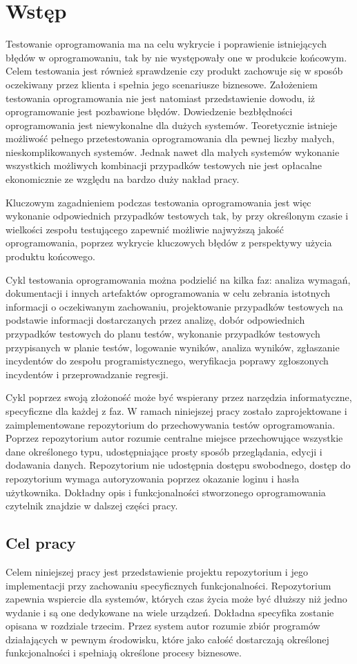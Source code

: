 \chapter{Wstęp}
Testowanie oprogramowania ma na celu wykrycie i poprawienie istniejących błędów w oprogramowaniu, tak by nie występowały one w produkcie końcowym. Celem testowania jest również sprawdzenie czy produkt zachowuje się w sposób oczekiwany przez klienta i spełnia jego scenariusze biznesowe. Założeniem testowania oprogramowania nie jest natomiast przedstawienie dowodu, iż oprogramowanie jest pozbawione błędów. Dowiedzenie bezbłędności oprogramowania jest niewykonalne dla dużych systemów. Teoretycznie istnieje możliwość pełnego przetestowania oprogramowania dla pewnej liczby małych, nieskomplikowanych systemów. Jednak nawet dla małych systemów wykonanie wszystkich możliwych kombinacji przypadków testowych nie jest opłacalne ekonomicznie ze względu na bardzo duży nakład pracy. 

Kluczowym zagadnieniem podczas testowania oprogramowania jest więc wykonanie odpowiednich przypadków testowych tak, by przy określonym czasie i wielkości zespołu testującego zapewnić możliwie najwyższą jakość oprogramowania, poprzez wykrycie kluczowych błędów z perspektywy użycia produktu końcowego.  

Cykl testowania oprogramowania można podzielić na kilka faz: analiza wymagań, dokumentacji i innych artefaktów oprogramowania w celu zebrania istotnych informacji o oczekiwanym zachowaniu, projektowanie przypadków testowych na podstawie informacji dostarczanych przez analizę, dobór odpowiednich przypadków testowych do planu testów, wykonanie przypadków testowych przypisanych w planie testów, logowanie wyników, analiza wyników, zgłaszanie incydentów do zespołu programistycznego, weryfikacja poprawy zgłoszonych incydentów i przeprowadzanie regresji.

Cykl poprzez swoją złożoność może być wspierany przez narzędzia informatyczne, specyficzne dla każdej z faz. W ramach niniejszej pracy zostało zaprojektowane i zaimplementowane repozytorium do przechowywania testów oprogramowania. Poprzez repozytorium autor rozumie centralne miejsce przechowujące wszystkie dane określonego typu, udostępniające prosty sposób przeglądania, edycji i dodawania danych. Repozytorium nie udostępnia dostępu swobodnego, dostęp do repozytorium wymaga autoryzowania poprzez okazanie loginu i hasła użytkownika. Dokładny opis i funkcjonalności stworzonego oprogramowania czytelnik znajdzie w dalszej części pracy.
\section{Cel pracy}
Celem niniejszej pracy jest przedstawienie projektu repozytorium i jego implementacji przy zachowaniu specyficznych funkcjonalności. Repozytorium zapewnia wspiercie dla systemów, których czas życia może być dłuższy niż jedno wydanie i są one dedykowane na wiele urządzeń. Dokładna specyfika zostanie opisana w rozdziale trzecim. Przez system autor rozumie zbiór programów działających w pewnym środowisku, które jako całość dostarczają określonej funkcjonalności i spełniają określone procesy biznesowe. 
